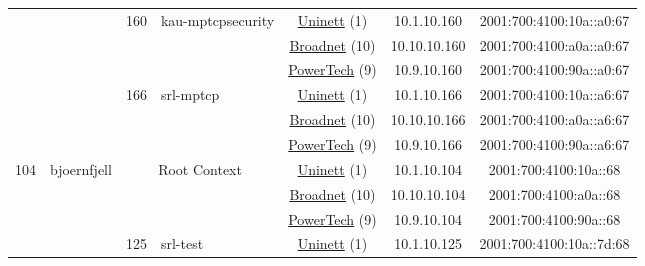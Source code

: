 \begin{small}
\begin{center}
\begin{longtable}{|c|c|c|c|c|c|c|c|}
  &  & \multirow{3}{*}{\tiny{160}} & \multicolumn{1}{|l|}{\multirow{3}{*}{\tiny{kau-mptcpsecurity}}} & \multicolumn{2}{|c|}{\tiny{\href{https://www.uninett.no}{Uninett} (1)}} & \tiny{10.1.10.160} & \tiny{2001:700:4100:10a::a0:67} \\* \cline{5-5}\cline{6-6}\cline{7-7}\cline{8-8}
  &  &  &  & \multicolumn{2}{|c|}{\tiny{\href{https://www.broadnet.no}{Broadnet} (10)}} & \tiny{10.10.10.160} & \tiny{2001:700:4100:a0a::a0:67} \\* \cline{5-5}\cline{6-6}\cline{7-7}\cline{8-8}
  &  &  &  & \multicolumn{2}{|c|}{\tiny{\href{http://www.powertech.no}{PowerTech} (9)}} & \tiny{10.9.10.160} & \tiny{2001:700:4100:90a::a0:67} \\* \cline{3-3}\cline{4-4}\cline{5-5}\cline{6-6}\cline{7-7}\cline{8-8}
  &  & \multirow{3}{*}{\tiny{166}} & \multicolumn{1}{|l|}{\multirow{3}{*}{\tiny{srl-mptcp}}} & \multicolumn{2}{|c|}{\tiny{\href{https://www.uninett.no}{Uninett} (1)}} & \tiny{10.1.10.166} & \tiny{2001:700:4100:10a::a6:67} \\* \cline{5-5}\cline{6-6}\cline{7-7}\cline{8-8}
  &  &  &  & \multicolumn{2}{|c|}{\tiny{\href{https://www.broadnet.no}{Broadnet} (10)}} & \tiny{10.10.10.166} & \tiny{2001:700:4100:a0a::a6:67} \\* \cline{5-5}\cline{6-6}\cline{7-7}\cline{8-8}
  &  &  &  & \multicolumn{2}{|c|}{\tiny{\href{http://www.powertech.no}{PowerTech} (9)}} & \tiny{10.9.10.166} & \tiny{2001:700:4100:90a::a6:67} \\ \hline
 \multirow{21}{*}{\tiny{104}} & \multicolumn{1}{|l|}{\multirow{21}{*}{\tiny{bjoernfjell}}} & \multicolumn{2}{|c|}{\multirow{3}{*}{\tiny{Root Context}}} & \multicolumn{2}{|c|}{\tiny{\href{https://www.uninett.no}{Uninett} (1)}} & \tiny{10.1.10.104} & \tiny{2001:700:4100:10a::68} \\* \cline{5-5}\cline{6-6}\cline{7-7}\cline{8-8}
  &  & \multicolumn{2}{|c|}{} & \multicolumn{2}{|c|}{\tiny{\href{https://www.broadnet.no}{Broadnet} (10)}} & \tiny{10.10.10.104} & \tiny{2001:700:4100:a0a::68} \\* \cline{5-5}\cline{6-6}\cline{7-7}\cline{8-8}
  &  & \multicolumn{2}{|c|}{} & \multicolumn{2}{|c|}{\tiny{\href{http://www.powertech.no}{PowerTech} (9)}} & \tiny{10.9.10.104} & \tiny{2001:700:4100:90a::68} \\* \cline{3-3}\cline{4-4}\cline{5-5}\cline{6-6}\cline{7-7}\cline{8-8}
  &  & \multirow{3}{*}{\tiny{125}} & \multicolumn{1}{|l|}{\multirow{3}{*}{\tiny{srl-test}}} & \multicolumn{2}{|c|}{\tiny{\href{https://www.uninett.no}{Uninett} (1)}} & \tiny{10.1.10.125} & \tiny{2001:700:4100:10a::7d:68} \\* \cline{5-5}\cline{6-6}\cline{7-7}\cline{8-8}

\end{longtable}
\end{center}
\end{small}
